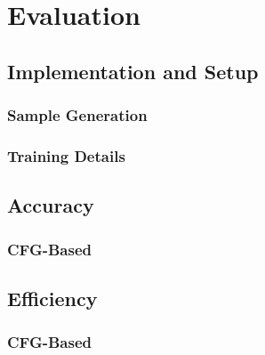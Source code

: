 \chapter{Evaluation}
\section{Implementation and Setup}
\subsection{Sample Generation}
\subsection{Training Details}
\section{Accuracy}
\subsection{CFG-Based}
\section{Efficiency}
\subsection{CFG-Based}
